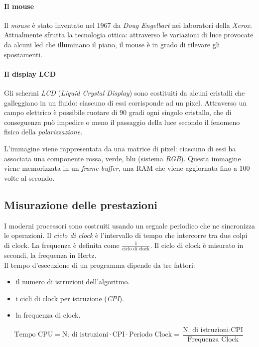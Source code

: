 \documentclass[class=book, crop=false]{standalone}
\begin{document}
\paragraph{Il mouse}
Il \emph{mouse} è stato inventato nel 1967 da \emph{Doug Engelbart} nei laboratori della \emph{Xerox}. Attualmente sfrutta la tecnologia ottica: attraverso le variazioni di luce provocate da alcuni led che illuminano il piano, il mouse è in grado di rilevare gli spostamenti.

\paragraph{Il display LCD}
Gli schermi \emph{LCD} (\emph{Liquid Crystal Display}) sono costituiti da alcuni cristalli che galleggiano in un fluido: ciascuno di essi corrisponde ad un pixel. Attraverso un campo elettrico è possibile ruotare di 90 gradi ogni singolo cristallo, che di conseguenza può impedire o meno il passaggio della luce secondo il fenomeno fisico della \emph{polarizzazione}.

L'immagine viene rappresentata da una matrice di pixel: ciascuno di essi ha associata una componente rossa, verde, blu (sistema \emph{RGB}). Questa immagine viene memorizzata in un \emph{frame buffer}, una RAM che viene aggiornata  fino a 100 volte al secondo.

\subsection{Misurazione delle prestazioni}
I moderni processori sono costruiti usando un segnale periodico che ne sincronizza le operazioni. Il \emph{ciclo di clock} è l’intervallo di tempo che intercorre tra due colpi di clock. La frequenza è definita come $\frac{1}{\text{ciclo di clock}}$. Il ciclo di clock è misurato in secondi, la frequenza in Hertz.\\
Il tempo d'esecuzione di un programma dipende da tre fattori:
\begin{itemize}[nolistsep]
	\item il numero di istruzioni dell'algoritmo.
	\item i cicli di clock per istruzione (\emph{CPI}).
	\item la frequenza di clock.
\end{itemize}
\begin{equation*}
\text{Tempo CPU} = \text{N. di istruzioni} \cdot \text{CPI} \cdot \text{Periodo Clock} = \frac{\text{N. di istruzioni} \cdot \text{CPI}}{\text{Frequenza Clock}}
\end{equation*}
\end{document}
